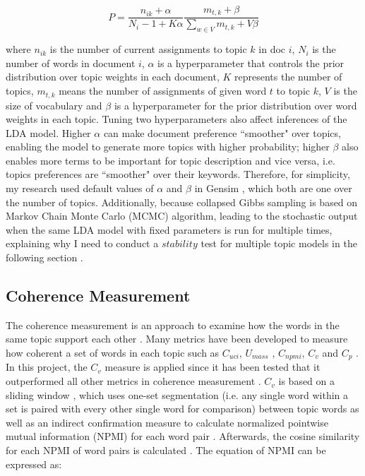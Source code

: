 \begin{equation}
  P = \frac{n_{ik} + \alpha}{N_i - 1 + K\alpha} \frac{m_{t,k} + \beta}{\sum_{w\in V}m_{t,k} + V\beta}
\end{equation}

where $n_{ik}$ is the number of current assignments to topic $k$ in doc $i$, $N_i$ is the number of words in document $i$, $\alpha$ is a hyperparameter that controls the prior distribution over topic weights in each document, $K$ represents the number of topics, $m_{t,k}$ means the number of assignments of given word $t$ to topic $k$, $V$ is the size of vocabulary and $\beta$ is a hyperparameter for the prior distribution over word weights in each topic. Tuning two hyperparameters also affect inferences of the LDA model. Higher $\alpha$ can make document preference ``smoother" over topics, enabling the model to generate more topics with higher probability; higher $\beta$ also enables more terms to be important for topic description and vice versa, i.e. topics preferences are ``smoother" over their keywords. Therefore, for simplicity, my research used default values of $\alpha$ and $\beta$ in Gensim \cite{gensim}, which both are one over the number of topics. Additionally, because collapsed Gibbs sampling is based on Markov Chain Monte Carlo (MCMC) algorithm, leading to the stochastic output when the same LDA model with fixed parameters is run for multiple times, explaining why I need to conduct a $stability$ test for multiple topic models in the following section \cite{chuang2015, Wang2019}.

\subsection{Coherence Measurement}

The coherence measurement is an approach to examine how the words in the same topic support each other \cite{aletras2013}. Many metrics have been developed to measure how coherent a set of words in each topic such as $C_{uci}$\cite{lau2014}, $U_{mass}$ \cite{Mimno2011}, $C_{npmi}$\cite{bouma2009}, $C_v$ \cite{michael2015} and $C_p$ \cite{fitelson2003}. In this project, the $C_v$ measure is applied since it has been tested that it outperformed all other metrics in coherence measurement \cite{michael2015}. $C_v$ is based on a sliding window \cite{newman2010}, which uses one-set segmentation (i.e. any single word within a set is paired with every other single word for comparison) between topic words as well as an indirect confirmation measure \cite{aletras2013} to calculate normalized pointwise mutual information (NPMI) for each word pair \cite{michael2015}. Afterwards, the cosine similarity for each NPMI of word pairs is calculated \cite{newman2010}. The equation of NPMI can be expressed as:

